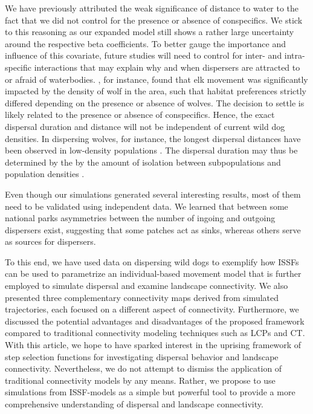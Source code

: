 \documentclass[abstract=on,10pt,a4paper,bibliography=totocnumbered]{article}
\begin{document}
We have previously attributed the weak significance of distance to water to the
fact that we did not control for the presence or absence of conspecifics. We
stick to this reasoning as our expanded model still shows a rather large
uncertainty around the respective beta coefficients. To better gauge the
importance and influence of this covariate, future studies will need to control
for inter- and intra-specific interactions that may explain why and when
dispersers are attracted to or afraid of waterbodies. \cite{Fortin.2005}, for
instance, found that elk movement was significantly impacted by the density of
wolf in the area, such that habitat preferences strictly differed depending on
the presence or absence of wolves. The decision to settle is likely related to
the presence or absence of conspecifics. Hence, the exact dispersal duration and
distance will not be independent of current wild dog densities. In dispersing
wolves, for instance, the longest dispersal distances have been observed in
low-density populations \citep{Boyd.2005, Wabakken.2007}. The dispersal duration
may thus be determined by the by the amount of isolation between subpopulations
and population densities \citep{DaviesMostert.2012}.

Even though our simulations generated several interesting results, most of them
need to be validated using independent data. We learned that between some
national parks asymmetries between the number of ingoing and outgoing dispersers
exist, suggesting that some patches act as sinks, whereas others serve as
sources for dispersers.

To this end, we have used data on dispersing wild dogs to exemplify how ISSFs
can be used to parametrize an individual-based movement model that is further
employed to simulate dispersal and examine landscape connectivity. We also
presented three complementary connectivity maps derived from simulated
trajectories, each focused on a different aspect of connectivity. Furthermore,
we discussed the potential advantages and disadvantages of the proposed
framework compared to traditional connectivity modeling techniques such as LCPs
and CT. With this article, we hope to have sparked interest in the uprising
framework of step selection functions for investigating dispersal behavior and
landscape connectivity. Nevertheless, we do not attempt to dismiss the
application of traditional connectivity models by any means. Rather, we propose
to use simulations from ISSF-models as a simple but powerful tool to provide a
more comprehensive understanding of dispersal and landscape connectivity.
\end{document}
